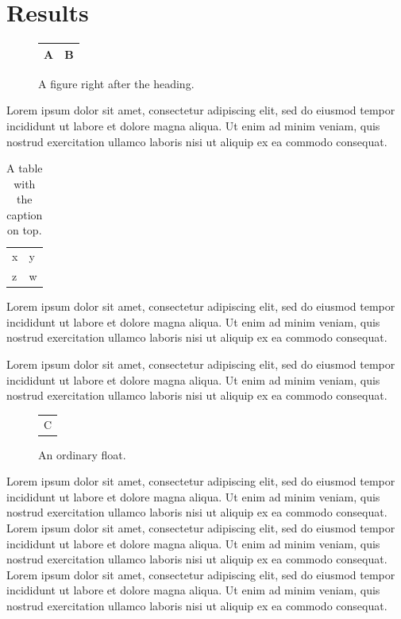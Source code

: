 \documentclass{article}
\begin{document}
\section{Results}
\begin{figure}[H]
\centering
\begin{tabular}{|c|c|}\hline A & B\\\hline\end{tabular}
\caption{A figure right after the heading.}\label{f1}
\end{figure}
Lorem ipsum dolor sit amet, consectetur adipiscing elit, sed do eiusmod tempor incididunt ut labore et dolore magna aliqua. Ut enim ad minim veniam, quis nostrud exercitation ullamco laboris nisi ut aliquip ex ea commodo consequat.
\begin{table}[H]
\caption{A table with the caption on top.}\label{t1}
\centering
\begin{tabular}{ll}x & y\\ z & w\end{tabular}
\end{table}
Lorem ipsum dolor sit amet, consectetur adipiscing elit, sed do eiusmod tempor incididunt ut labore et dolore magna aliqua. Ut enim ad minim veniam, quis nostrud exercitation ullamco laboris nisi ut aliquip ex ea commodo consequat.

Lorem ipsum dolor sit amet, consectetur adipiscing elit, sed do eiusmod tempor incididunt ut labore et dolore magna aliqua. Ut enim ad minim veniam, quis nostrud exercitation ullamco laboris nisi ut aliquip ex ea commodo consequat.
\begin{figure}[h]
\centering\begin{tabular}{c}C\end{tabular}
\caption{An ordinary float.}
\end{figure}
Lorem ipsum dolor sit amet, consectetur adipiscing elit, sed do eiusmod tempor incididunt ut labore et dolore magna aliqua. Ut enim ad minim veniam, quis nostrud exercitation ullamco laboris nisi ut aliquip ex ea commodo consequat. Lorem ipsum dolor sit amet, consectetur adipiscing elit, sed do eiusmod tempor incididunt ut labore et dolore magna aliqua. Ut enim ad minim veniam, quis nostrud exercitation ullamco laboris nisi ut aliquip ex ea commodo consequat. Lorem ipsum dolor sit amet, consectetur adipiscing elit, sed do eiusmod tempor incididunt ut labore et dolore magna aliqua. Ut enim ad minim veniam, quis nostrud exercitation ullamco laboris nisi ut aliquip ex ea commodo consequat.
\end{document}
